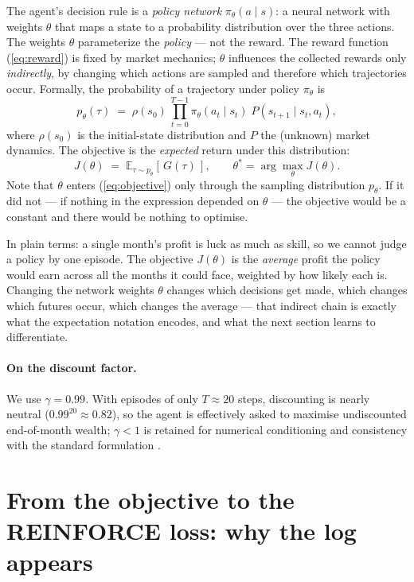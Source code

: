 The agent's decision rule is a \emph{policy network}
$\pi_\theta(a \mid s)$: a neural network with weights $\theta$ that maps a
state to a probability distribution over the three actions. The weights
$\theta$ parameterize the \emph{policy} --- not the reward. The reward
function (\ref{eq:reward}) is fixed by market mechanics; $\theta$
influences the collected rewards only \emph{indirectly}, by changing which
actions are sampled and therefore which trajectories occur. Formally, the
probability of a trajectory under policy $\pi_\theta$ is
\begin{equation}
p_\theta(\tau) \;=\; \rho(s_0)\,
\prod_{t=0}^{T-1} \pi_\theta(a_t \mid s_t)\; P(s_{t+1} \mid s_t, a_t),
\label{eq:traj_prob}
\end{equation}
where $\rho(s_0)$ is the initial-state distribution and $P$ the (unknown)
market dynamics. The objective is the \emph{expected} return under this
distribution:
\begin{equation}
J(\theta) \;=\; \mathbb{E}_{\tau \sim p_\theta}\!\left[\, G(\tau) \,\right],
\qquad
\theta^\ast = \arg\max_\theta J(\theta).
\label{eq:objective}
\end{equation}
Note that $\theta$ enters (\ref{eq:objective}) only through the sampling
distribution $p_\theta$. If it did not --- if nothing in the expression
depended on $\theta$ --- the objective would be a constant and there would
be nothing to optimise.

In plain terms: a single month's profit is luck as much as skill, so we
cannot judge a policy by one episode. The objective $J(\theta)$ is the
\emph{average} profit the policy would earn across all the months it
could face, weighted by how likely each is. Changing the network weights
$\theta$ changes which decisions get made, which changes which futures
occur, which changes the average --- that indirect chain is exactly what
the expectation notation encodes, and what the next section learns to
differentiate.

\paragraph{On the discount factor.} We use $\gamma = 0.99$. With
episodes of only $T \approx 20$ steps, discounting is nearly neutral
($0.99^{20} \approx 0.82$), so the agent is effectively asked to maximise
undiscounted end-of-month wealth; $\gamma < 1$ is retained for numerical
conditioning and consistency with the standard formulation
\cite{sutton2018}.

\section{From the objective to the REINFORCE loss: why the log appears}
\label{sec:pg_derivation}

